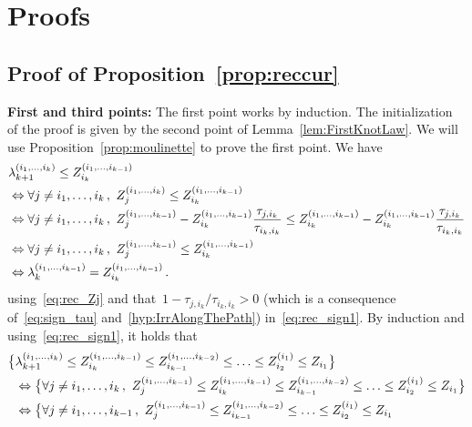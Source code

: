\documentclass[final,numbib]{imaiai}%
\numberwithin{equation}{section}
\def\\bUnif{\text{\bUnif}}
\newcommand{\<}{\langle}
\renewcommand{\>}{\rangle}
\newcommand{\1}{\mathds{1}}
\begin{document}
{\section{Proofs}

\subsection{Proof of Proposition~\ref{prop:reccur}}
\label{proof:reccur}
\noindent
{\bf First and third points: } The first point works by induction. The initialization of the proof is given by the second point of Lemma~\ref{lem:FirstKnotLaw}. We will use Proposition~\ref{prop:moulinette} to prove the first point. We have
\begin{align}
&\lambda_{k+1}^{(i_1,\ldots, i_{k})}\leq Z_{i_k}^{(i_1,\ldots, i_{k-1})}\notag\\
&\Leftrightarrow
\forall j\neq i_1,\ldots, i_{k}\,,\ Z^{(i_1,\ldots, i_{k})}_j\leq Z_{i_k}^{(i_1,\ldots, i_{k-1})}\notag\\
&\Leftrightarrow
\forall j\neq i_1,\ldots, i_{k}\,,\ Z^{(i_1,\ldots, i_{k-1})}_j-Z^{(i_1,\ldots, i_{k-1})}_{i_k}\frac{\tau_{j,i_k}}{\tau_{i_k,i_k}}\leq Z_{i_k}^{(i_1,\ldots, i_{k-1})}-Z_{i_k}^{(i_1,\ldots, i_{k-1})}\frac{\tau_{j,i_k}}{\tau_{i_k,i_k}}\notag\\
&\Leftrightarrow
\forall j\neq i_1,\ldots, i_{k}\,,\ Z^{(i_1,\ldots, i_{k-1})}_j\leq Z_{i_k}^{(i_1,\ldots, i_{k-1})}\label{eq:rec_sign1}\\
&\Leftrightarrow
\lambda^{(i_1,\ldots, i_{k-1})}_{k}= Z_{i_k}^{(i_1,\ldots, i_{k-1})}\notag\,.
\end{align}
using~\eqref{eq:rec_Zj} and that~$1-{\tau_{j,i_k}}/{\tau_{i_k,i_k}}>0$ (which is a consequence of~\eqref{eq:sign_tau} and~\eqref{hyp:IrrAlongThePath})  in~\eqref{eq:rec_sign1}. By induction and using~\eqref{eq:rec_sign1}, it holds that
\begin{align*}
\big\{
&\lambda_{k+1}^{(i_1,\ldots, i_{k})}\leq Z_{i_k}^{(i_1,\ldots, i_{k-1})}\leq Z_{i_{k-1}}^{(i_1,\ldots, i_{k-2})}\leq\ldots\leq Z_{i_2}^{(i_1)}\leq Z_{i_1}\big\}\notag\\
&\Leftrightarrow\big\{\forall j\neq i_1,\ldots, i_{k}\,,\ 
Z^{(i_1,\ldots, i_{k-1})}_j\leq Z_{i_k}^{(i_1,\ldots, i_{k-1})}\leq Z_{i_{k-1}}^{(i_1,\ldots, i_{k-2})}\leq\ldots\leq Z_{i_2}^{(i_1)}\leq Z_{i_1}\big\}\\
&\Leftrightarrow\big\{\forall j\neq i_1,\ldots, i_{k-1}\,,\ 
Z^{(i_1,\ldots, i_{k-1})}_j\leq Z_{i_{k-1}}^{(i_1,\ldots, i_{k-2})}\leq\ldots\leq Z_{i_2}^{(i_1)}\leq Z_{i_1}\\

\end{align*}}
\end{document}
